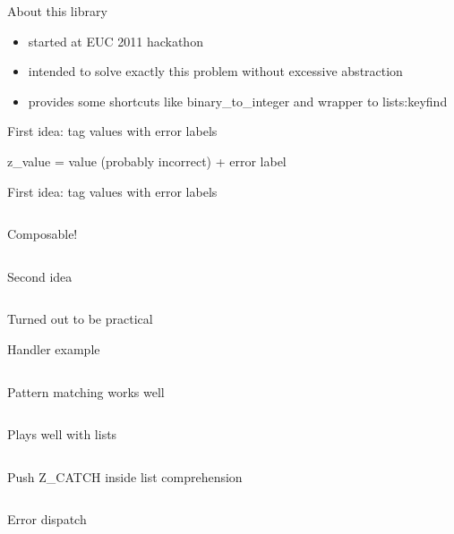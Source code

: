 \documentclass[10pt]{beamer}
\newcommand{\code}[4]{\inputminted[linenos, frame=none, firstline=#2, lastline=#3,
  framesep=10pt, bgcolor=lightgray]{#4}{#1}}
\begin{document}
\begin{frame}{About this library}
  \begin{itemize}
  \item started at EUC 2011 hackathon
  \item intended to solve exactly this problem without excessive abstraction
  \item provides some shortcuts like binary\_to\_integer and wrapper to lists:keyfind
  \end{itemize}
\end{frame}

\begin{frame}{First idea: tag values with error labels}
  \begin{center}
    \large
    z\_value = value (probably incorrect) + error label
  \end{center}
\end{frame}

\begin{frame}{First idea: tag values with error labels}
  \code{code.erl}{122}{133}{erlang}
\end{frame}

\begin{frame}{Composable!}
  \code{code.erl}{134}{138}{erlang}
\end{frame}

\begin{frame}{Second idea}
  \code{code.erl}{140}{145}{erlang}
  Turned out to be practical
\end{frame}

\begin{frame}{Handler example}
  \footnotesize
  \code{code.erl}{147}{162}{erlang}
\end{frame}

\begin{frame}{Pattern matching works well}
  \small
  \code{code.erl}{164}{167}{erlang}
\end{frame}

\begin{frame}{Plays well with lists}
  \small
  \code{code.erl}{169}{172}{erlang}
\end{frame}

\begin{frame}{Push Z\_CATCH inside list comprehension}
  \small
  \code{code.erl}{174}{176}{erlang}
\end{frame}

\begin{frame}{Error dispatch}
  \code{code.erl}{178}{183}{erlang}
\end{frame}
\end{document}
